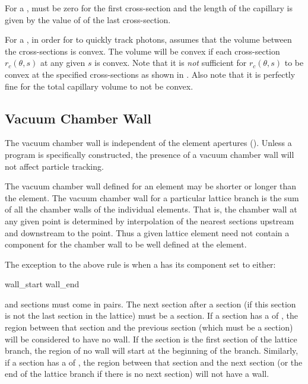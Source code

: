 For a ,  must be zero for the first cross-section and the length of the
capillary is given by the value of  of the last cross-section.

For a , in order for \bmad to quickly track photons, \bmad assumes that the volume
between the cross-sections is convex. The volume will be convex if each cross-section $r_c(\theta,
s)$ at any given $s$ is convex. Note that it is {\em not} sufficient for $r_c(\theta, s)$ to be
convex at the specified cross-sections as shown in . Also note that it is
perfectly fine for the total capillary volume to not be convex.

\subsection{Vacuum Chamber Wall}
\label{s:wall.vacuum}

The vacuum chamber wall is independent of the element apertures (). Unless a program
is specifically constructed, the presence of a vacuum chamber wall will not affect particle
tracking.

The vacuum chamber wall defined for an element may be shorter or longer than the element.  The
vacuum chamber wall for a particular lattice branch is the sum of all the chamber walls of the
individual elements. That is, the chamber wall at any given point is determined by interpolation of
the nearest sections upstream and downstream to the point.  Thus a given lattice element need not
contain a  component for the chamber wall to be well defined at the element.

The exception to the above rule is when a  has its
 component set to either:
\begin{example}
  wall_start
  wall_end
\end{example}
 and  sections must come in pairs. The next section after a
 section (if this section is not the last section in the lattice) must be a
 section.  If a section has a  of , the region between that
section and the previous section (which must be a  section) will be considered to have
no wall. If the  section is the first section of the lattice branch, the region of no
wall will start at the beginning of the branch. Similarly, if a section has a  of
, the region between that section and the next section (or the end of the lattice
branch if there is no next section) will not have a wall.

